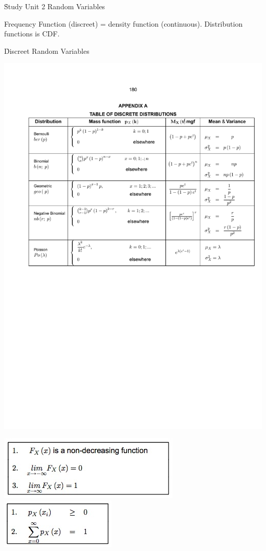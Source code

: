 \documentclass{examnotes}
\begin{document}
\h{Study Unit 2 Random Variables}

Frequency Function (discreet) = density function (continuous).
Distribution functions is CDF.

\h{Discreet Random Variables}

\includegraphics[scale=0.9]{./img/dis.pdf}

\includegraphics[scale=0.8]{./img/2cum.jpg}
\includegraphics[scale=0.8]{./img/2dis.jpg}
\end{document}
